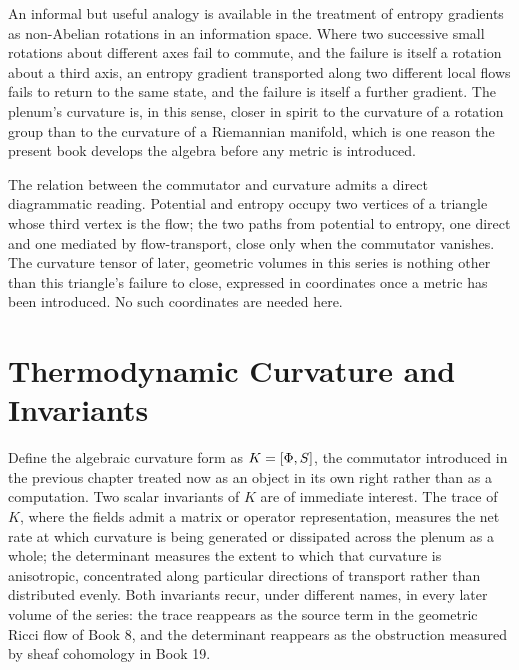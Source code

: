 An informal but useful analogy is available in the treatment of entropy gradients as non-Abelian rotations in an information space. Where two successive small rotations about different axes fail to commute, and the failure is itself a rotation about a third axis, an entropy gradient transported along two different local flows fails to return to the same state, and the failure is itself a further gradient. The plenum's curvature is, in this sense, closer in spirit to the curvature of a rotation group than to the curvature of a Riemannian manifold, which is one reason the present book develops the algebra before any metric is introduced.

The relation between the commutator and curvature admits a direct diagrammatic reading. Potential and entropy occupy two vertices of a triangle whose third vertex is the flow; the two paths from potential to entropy, one direct and one mediated by flow-transport, close only when the commutator vanishes. The curvature tensor of later, geometric volumes in this series is nothing other than this triangle's failure to close, expressed in coordinates once a metric has been introduced. No such coordinates are needed here.

\chapter{Thermodynamic Curvature and Invariants}

Define the algebraic curvature form as $K = [\Phi, S]$, the commutator introduced in the previous chapter treated now as an object in its own right rather than as a computation. Two scalar invariants of $K$ are of immediate interest. The trace of $K$, where the fields admit a matrix or operator representation, measures the net rate at which curvature is being generated or dissipated across the plenum as a whole; the determinant measures the extent to which that curvature is anisotropic, concentrated along particular directions of transport rather than distributed evenly. Both invariants recur, under different names, in every later volume of the series: the trace reappears as the source term in the geometric Ricci flow of Book 8, and the determinant reappears as the obstruction measured by sheaf cohomology in Book 19.

